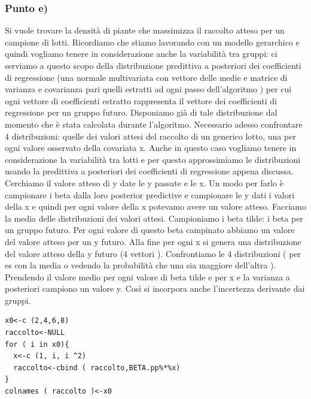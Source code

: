 \subsubsection*{Punto e)}
Si vuole trovare la densità di piante che massimizza il raccolto atteso 
per un campione di lotti. Ricordiamo che stiamo lavorando con un modello 
gerarchico e quindi vogliamo tenere in considerazione anche la variabilità tra gruppi: 
ci serviamo a questo scopo della distribuzione predittiva a posteriori dei 
coefficienti di regressione (una normale multivariata con vettore delle medie e 
matrice di varianza e covarianza pari quelli estratti ad ogni passo dell'algoritmo ) 
per cui ogni vettore di coefficienti estratto rappresenta il vettore dei coefficienti 
di regressione per un gruppo futuro. Disponiamo già di tale distribuzione dal 
momento che è stata calcolata durante l'algoritmo. 
Necessario adesso confrontare 4 distribuzioni: quelle dei valori attesi del 
raccolto di un generico lotto, una per ogni valore osservato della covariata x. 
Anche in questo caso vogliamo tenere in considerazione la variabilità tra lotti e per 
questo approssimiamo le distribuzioni usando la predittiva a posteriori dei 
coefficienti di regressione appena discussa. Cerchiamo il valore atteso di y date 
le y passate e le x. Un modo per farlo è campionare i beta dalla loro posterior 
predictive e campionare le y dati i valori della x e quindi per ogni valore della x 
potevamo avere un valore atteso. Facciamo la media delle distribuzioni dei valori 
attesi. Campioniamo i beta tilde: i beta per un gruppo futuro. Per ogni valore di 
questo beta campinato abbiamo un valore del valore atteso per un y futuro. 
Alla fine per ogni x si genera una distribuzione del valore atteso della y futuro 
(4 vettori ). Confrontiamo le 4 distribuzioni ( per es con la media o vedendo la 
probabilità che una sia maggiore dell'altra ). Prendendo il valore medio per ogni valore 
di beta tilde e per x e la varianza a posteriori campiono un valore y. 
Così si incorpora anche l'incertezza derivante dai gruppi.
\newpage
\begin{lstlisting}[style=R]
x0<-c (2,4,6,8)
raccolto<-NULL
for ( i in x0){
  x<-c (1, i, i ^2)
  raccolto<-cbind ( raccolto,BETA.pp%*%x)
}
colnames ( raccolto )<-x0
\end{lstlisting}

